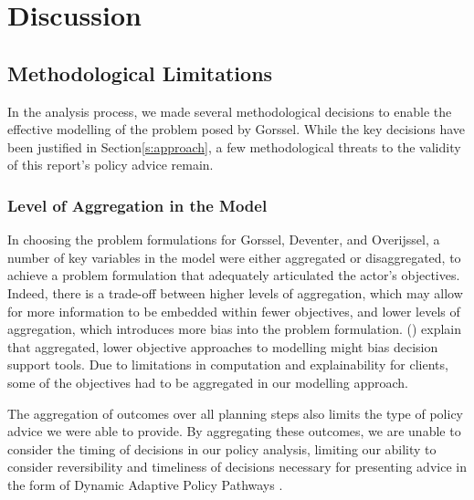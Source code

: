 \section{Discussion}
\label{s:discussion}




\subsection{Methodological Limitations}
In the analysis process, we made several methodological decisions to enable the effective modelling of the problem posed by Gorssel. While the key decisions have been justified in Section\ref{s:approach}, a few methodological threats to the validity of this report's policy advice remain.

\subsubsection{Level of Aggregation in the Model}
In choosing the problem formulations for Gorssel, Deventer, and Overijssel, a number of key variables in the model were either aggregated or disaggregated, to achieve a problem formulation that adequately articulated the actor's objectives. Indeed, there is a trade-off between higher levels of aggregation, which may allow for more information to be embedded within fewer objectives, and lower levels of aggregation, which introduces more bias into the problem formulation. \citeauthor{kasprzyk_battling_2016} (\citeyear{kasprzyk_battling_2016}) explain that aggregated, lower objective approaches to modelling might bias decision support tools. Due to limitations in computation and explainability for clients, some of the objectives had to be aggregated in our modelling approach. 

The aggregation of outcomes over all planning steps also limits the type of policy advice we were able to provide. By aggregating these outcomes, we are unable to consider the timing of decisions in our policy analysis, limiting our ability to consider reversibility and timeliness of decisions necessary for presenting advice in the form of Dynamic Adaptive Policy Pathways \parencite{kwakkel_coping_2016,marchau_decision_2019}.

